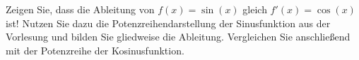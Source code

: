 \item Zeigen Sie, dass die Ableitung von $f(x)=\sin(x)$ gleich $f'(x)=\cos(x)$ ist! Nutzen Sie dazu die Potenzreihendarstellung der Sinusfunktion aus der Vorlesung und bilden Sie gliedweise die Ableitung. Vergleichen Sie anschließend mit der Potenzreihe der Kosinusfunktion.